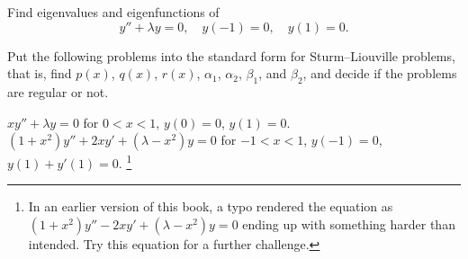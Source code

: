 \documentclass{ximera}
\begin{document}

\begin{exercise}
    Find eigenvalues and eigenfunctions of
    \begin{equation*}
        y'' + \lambda y = 0, \quad y(-1) = 0, \quad y(1) = 0 .
    \end{equation*}
\end{exercise}

\begin{exercise}
    Put the following problems into the standard form for Sturm--Liouville problems, that is, find $p(x)$, $q(x)$, $r(x)$, $\alpha_1$, $\alpha_2$, $\beta_1$, and $\beta_2$, and decide if the problems are regular or not.
    \begin{tasks}
    \task $x y'' + \lambda y = 0$ \enspace for $0 < x < 1$, \enspace $y(0) = 0$, \enspace $y(1) = 0$.
    \task $(1+x^2) y'' + 2xy' + (\lambda-x^2) y = 0$ \enspace for $-1 < x < 1$, \enspace $y(-1) = 0$, \enspace $y(1)+y'(1) = 0$.%
        \footnote{%
            In an earlier version of this book, a typo rendered the equation as $(1+x^2) y'' - 2xy' + (\lambda-x^2) y = 0$ ending up with something harder than intended.  Try this equation for a further challenge.
            }
    \end{tasks}
\end{exercise}
\end{document}
